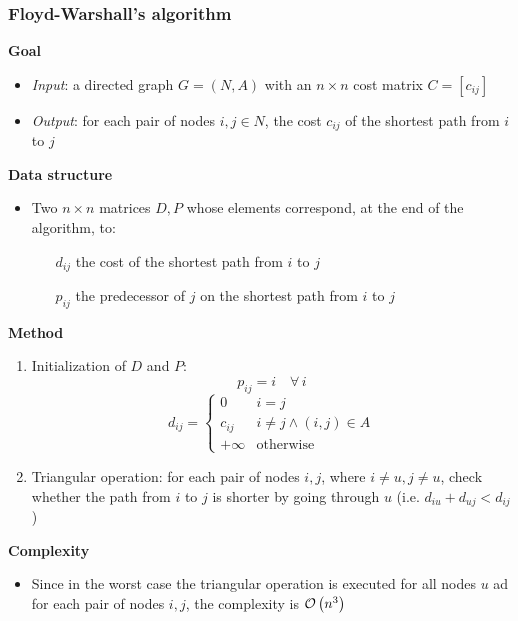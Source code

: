 \documentclass[english]{article}
\begin{document}
\subsubsection{Floyd-Warshall's algorithm}

\textbf{Goal}
\begin{itemize}[label=\(\rightarrow\)]
  \item \textit{Input}: a directed graph \(G = (N, A)\) with an \(n \times n\) cost matrix \(C = [c_{ij}]\)
  \item \textit{Output}: for each pair of nodes \(i, j \in N\), the cost \(c_{ij}\) of the shortest path from \(i\) to \(j\)
\end{itemize}

\bigskip
\textbf{Data structure}
\begin{itemize}
  \item Two \(n \times n\) matrices \(D, P\) whose elements correspond, at the end of the algorithm, to:
        \begin{itemize}
          \item[\(d_{ij}\)] the cost of the shortest path from \(i\) to \(j\)
          \item[\(p_{ij}\)] the predecessor of \(j\) on the shortest path from \(i\) to \(j\)
        \end{itemize}
\end{itemize}

\bigskip
\textbf{Method}
\begin{enumerate}
  \item Initialization of \(D\) and \(P\):
        \[ p_{ij} = i \quad \forall \, i \]
        \[ d_{ij} = \begin{cases} 0 \quad & i = j \\ c_{ij} & i \neq j \land (i, j) \in A \\ +\infty & \text{otherwise}  \end{cases} \]
  \item Triangular operation: for each pair of nodes \(i, j\), where \(i \neq u, j \neq u\), check whether the path from \(i\) to \(j\) is shorter by going through \(u\) (i.e. \(d_{iu} + d_{uj} < d_{ij}\))
\end{enumerate}

\bigskip
\textbf{Complexity}
\begin{itemize}
  \item Since in the worst case the triangular operation is executed for all nodes \(u\) ad for each pair of nodes \(i, j\), the complexity is \(\mathcal{O}\left(n^3\right)\)
\end{itemize}
\end{document}
